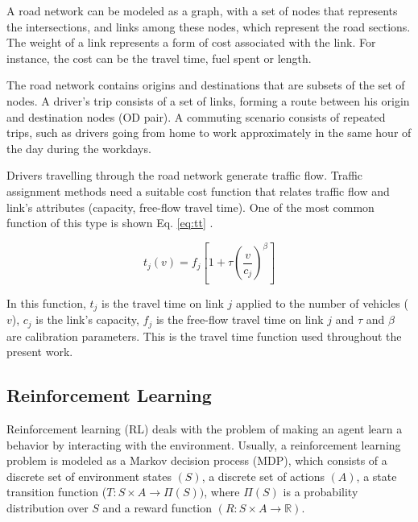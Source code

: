 \documentclass{RITA}
\newcommand{\travTime}{\ensuremath{t_j}} 	%
\newcommand{\fftt}{\ensuremath{f_j}} 		%
\newcommand{\linkCap}{\ensuremath{c_j}}		%
\newcommand{\veh}{\ensuremath{v}}		%
\begin{document}
A road network can be modeled as a graph, with a set of nodes that represents the intersections, and links among these nodes, which represent the road sections. The weight of a link represents a form of cost associated with the link. For instance, the cost can be the travel time, fuel spent or length. 

The road network contains origins and destinations that are subsets of the set of nodes. A driver's trip consists of a set of links, forming a route between his origin and destination nodes (OD pair). A commuting scenario consists of repeated trips, such as drivers going from home to work approximately in the same hour of the day during the workdays.

Drivers travelling through the road network generate traffic flow. Traffic assignment methods need a suitable cost function that relates traffic flow and link's attributes (capacity, free-flow travel time). %
One of the most common function of this type is shown Eq. \eqref{eq:tt} \cite[p.~325]{Ortuzar&Willumsen2001}.

\begin{equation}
\label{eq:tt}
\travTime(\veh) = \fftt[1 + \tau \left(\frac{\veh}{\linkCap}\right)^\beta]
\end{equation}

In this function, $\travTime$ is the travel time on link $j$ applied to the number of vehicles ($\veh$), $\linkCap$ is the link's capacity, $\fftt$ is the free-flow travel time on link $j$ and $\tau$ and $\beta$ are calibration parameters. This is the travel time function used throughout the present work.

\subsection{Reinforcement Learning}
\label{sec:rl}
Reinforcement learning (RL) deals with the problem of making an agent learn a behavior by interacting with the environment. Usually, a reinforcement learning problem is modeled as a Markov decision process (MDP), which consists of a discrete set of environment states $(S)$, a discrete set of actions $(A)$, a state transition function ($T: S \times A \to \Pi(S))$, where $\Pi(S)$ is a probability distribution over $S$ and a reward function $(R: S \times A \to \mathbb{R})$. %
\end{document}
